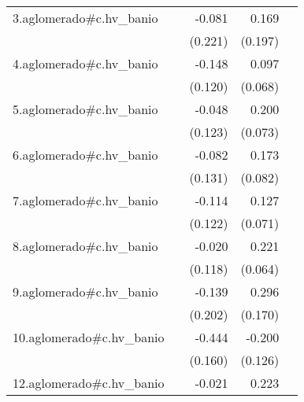 {\begin{longtable}{l*{4}{D{.}{.}{-1}}}
\addlinespace
3.aglomerado#c.hv\_banio&                     &      -0.081         &       0.169         &                     \\
            &                     &     (0.221)         &     (0.197)         &                     \\
\addlinespace
4.aglomerado#c.hv\_banio&                     &      -0.148         &       0.097         &                     \\
            &                     &     (0.120)         &     (0.068)         &                     \\
\addlinespace
5.aglomerado#c.hv\_banio&                     &      -0.048         &       0.200\sym{**} &                     \\
            &                     &     (0.123)         &     (0.073)         &                     \\
\addlinespace
6.aglomerado#c.hv\_banio&                     &      -0.082         &       0.173\sym{*}  &                     \\
            &                     &     (0.131)         &     (0.082)         &                     \\
\addlinespace
7.aglomerado#c.hv\_banio&                     &      -0.114         &       0.127         &                     \\
            &                     &     (0.122)         &     (0.071)         &                     \\
\addlinespace
8.aglomerado#c.hv\_banio&                     &      -0.020         &       0.221\sym{***}&                     \\
            &                     &     (0.118)         &     (0.064)         &                     \\
\addlinespace
9.aglomerado#c.hv\_banio&                     &      -0.139         &       0.296         &                     \\
            &                     &     (0.202)         &     (0.170)         &                     \\
\addlinespace
10.aglomerado#c.hv\_banio&                     &      -0.444\sym{**} &      -0.200         &                     \\
            &                     &     (0.160)         &     (0.126)         &                     \\
\addlinespace
12.aglomerado#c.hv\_banio&                     &      -0.021         &       0.223\sym{*}  &                     \\

\end{longtable}}
